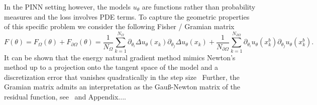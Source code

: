 In the PINN setting however, the models $u_\theta$ are functions rather than probability measures %
and the loss involves PDE terms.
To capture the geometric properties of this specific problem we consider the following Fisher / Gramian matrix %
\begin{equation}
  F(\theta) = F_\Omega(\theta) + F_{\partial\Omega}(\theta) = \frac1{{N_\Omega}} \sum_{k=1}^{N_\Omega} \partial_{\theta_i} \Delta u_\theta(x_k) \partial_{\theta_j} \Delta u_\theta(x_k) + \frac1{{N_{\partial\Omega}}} \sum_{k=1}^{N_{\partial\Omega}} \partial_{\theta_i} u_\theta(x_k^b) \partial_{\theta_j} u_\theta (x_k^b).
\end{equation}
It can be shown that the energy natural gradient method mimics Newton's method up to a projection onto the tangent space of the model and a discretization error that vanishes quadratically in the step size~\cite{muller2023achieving, }
Further, the Gramian matrix admits an interpretation as the Gauß-Newton matrix of the residual function, see~\cite{} and Appendix....

